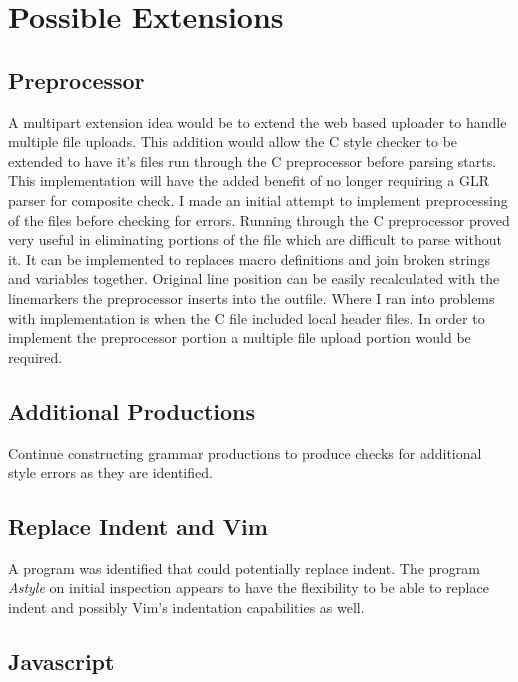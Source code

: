 \chapter{Possible Extensions}
\label{chap:EXTENSION}

\section{Preprocessor}

A multipart extension idea would be to extend the web based uploader to handle 
multiple file uploads. This addition would allow the C style checker to be 
extended to have it's files run through the C preprocessor before parsing 
starts. This implementation will have the added benefit of no longer requiring
a GLR parser for composite check. I made an initial attempt to implement 
preprocessing of the files before checking for errors. Running through the C 
preprocessor proved very useful in eliminating portions of the file which are 
difficult to parse without it. It can be implemented to replaces macro 
definitions and join broken strings and variables together. 
Original line position can be easily recalculated with the linemarkers the 
preprocessor inserts into the outfile. Where I ran into problems with 
implementation is when the C file included local header files. In order to 
implement the preprocessor portion a multiple file upload portion would be 
required.

\section{Additional Productions}

Continue constructing grammar productions to produce checks for additional 
style errors as they are identified.

\section{Replace Indent and Vim}

A program was identified that could potentially replace indent. The program 
\emph{Astyle} on initial inspection appears to have the flexibility to be able 
to replace indent and possibly Vim's indentation capabilities as well.

\section{Javascript}

